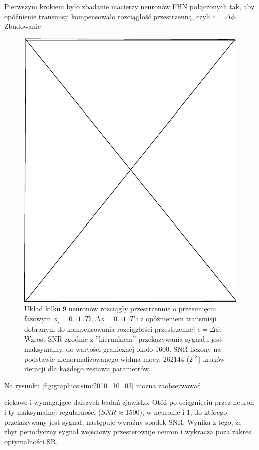   Pierwszym krokiem było zbadanie macierzy neuronów FHN połączonych tak, aby opóźnienie transmisji kompensowało rozciągłość przestrzenną, czyli $c = \Delta \phi$. Zbudowanie

  \begin{figure}
    \includegraphics[width=120mm]{images/pending}
    \caption{Układ kilku 9 neuronów rozciągły przestrzennie o przesunięciu fazowym $\phi_i = 0.111 T i, \Delta \phi = 0.111 T$ i z opóźnieniem transmisji dobranym do kompensowania rozciągłości przestrzennej $c = \Delta \phi$. Wzrost SNR zgodnie z ''kierunkiem'' przekazywania sygnału jest maksymalny, do wartości granicznej około 1600. SNR liczony na podstawie nienormalizowanego widma mocy. 262144 ($2^{18}$) kroków iteracji dla każdego zestawu parametrów.}
    \label{fig:graphics:sim:2010_10_03b}
  \end{figure}

  Na rysunku \ref{fig:graphics:sim:2010_10_03} można zaobserwować 

  ciekawe i wymagające dalszych badań zjawisko. Otóż po osiągnięciu przez neuron i-ty maksymalnej regularności ($SNR \approx 1500$), w neuronie i-1, do którego przekazywany jest sygnał, następuje wyraźny spadek SNR. Wynika z tego, że zbyt periodyczny sygnał wejściowy przesterowuje neuron i wykracza poza zakres optymalności SR.
  

